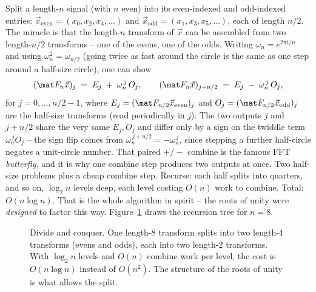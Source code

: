 Split a length-$n$ signal (with $n$ even) into its even-indexed and odd-indexed
entries: $\vec x_{\text{even}} = (x_0,x_2,x_4,\dots)$ and $\vec x_{\text{odd}} =
(x_1,x_3,x_5,\dots)$, each of length $n/2$. The miracle is that the length-$n$
transform of $\vec x$ can be assembled from two length-$n/2$ transforms -- one of
the evens, one of the odds. Writing $\omega_n=e^{2\pi i/n}$ and using
$\omega_n^2=\omega_{n/2}$ (going twice as fast around the circle is the same as one
step around a half-size circle), one can show
\[
  (\mat F_n\vec x)_j \;=\; E_j \;+\; \omega_n^{\,j}\,O_j,
  \qquad
  (\mat F_n\vec x)_{j+n/2} \;=\; E_j \;-\; \omega_n^{\,j}\,O_j,
\]
for $j=0,\dots,n/2-1$, where $E_j=(\mat F_{n/2}\vec x_{\text{even}})_j$ and
$O_j=(\mat F_{n/2}\vec x_{\text{odd}})_j$ are the half-size transforms (read
periodically in $j$). The two outputs $j$ and $j+n/2$ share the very same
$E_j,O_j$ and differ only by a sign on the twiddle term $\omega_n^{\,j}O_j$ -- the
sign flip comes from $\omega_n^{\,j+n/2}=-\omega_n^{\,j}$, since stepping a
further half-circle negates a unit-circle number. That paired $+/-$ combine is the
famous FFT \emph{butterfly}, and it is why one combine step produces two outputs at
once. Two half-size problems plus a cheap combine step. Recurse: each half splits
into
quarters, and so on, $\log_2 n$ levels deep, each level costing $O(n)$ work to
combine. Total: $O(n\log n)$. That is the whole algorithm in spirit -- the roots of
unity were \emph{designed} to factor this way. Figure~\ref{ch32:fft} draws the
recursion tree for $n=8$.

\begin{figure}[H]
\centering
{}
\caption{Divide and conquer. One length-$8$ transform splits into two length-$4$
transforms (evens and odds), each into two length-$2$ transforms. With $\log_2 n$
levels and $O(n)$ combine work per level, the cost is $O(n\log n)$ instead of
$O(n^2)$. The structure of the roots of unity is what allows the split.}
\label{ch32:fft}
\end{figure}

